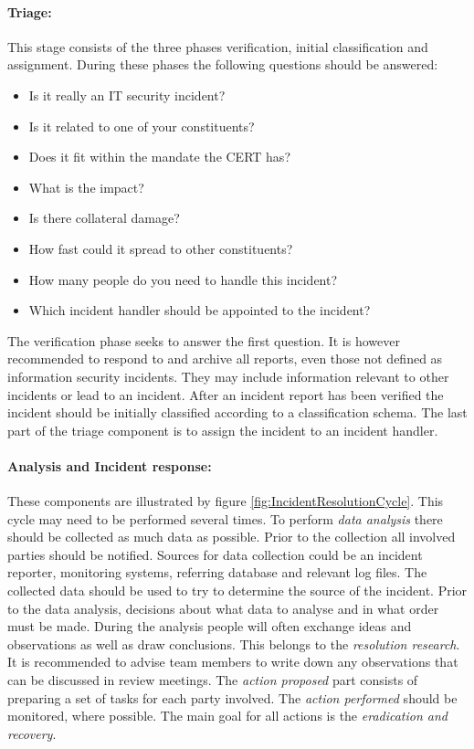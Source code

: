 \paragraph{Triage:} This stage consists of the three phases verification, initial classification and assignment. During these phases the following questions should be answered:

\begin{itemize}\itemsep-0.2cm
\item Is it really an IT security incident?
\item Is it related to one of your constituents?
\item Does it fit within the mandate the \ac{CERT} has?
\item What is the impact?
\item Is there collateral damage?
\item How fast could it spread to other constituents?
\item How many people do you need to handle this incident?
\item Which incident handler should be appointed to the incident?
\end{itemize}

The verification phase seeks to answer the first question. It is however recommended to respond to and archive all reports, even those not defined as information security incidents. They may include information relevant to other incidents or lead to an incident. After an incident report has been verified the incident should be initially classified according to a classification schema. The last part of the triage component is to assign the incident to an incident handler.

\paragraph{Analysis and Incident response:} These components are illustrated by figure \ref{fig:IncidentResolutionCycle}. This cycle may need to be performed several times. To perform \textit{data analysis} there should be collected as much data as possible. Prior to the collection all involved parties should be notified. Sources for data collection could be an incident reporter, monitoring systems, referring database and relevant log files. The collected data should be used to try to determine the source of the incident. Prior to the data analysis, decisions about what data to analyse and in what order must be made. During the analysis people will often exchange ideas and observations as well as draw conclusions. This belongs to the \textit{resolution research}. It is recommended to advise team members to write down any observations that can be discussed in review meetings. The \textit{action proposed} part consists of preparing a set of tasks for each party involved. The \textit{action performed} should be monitored, where possible. The main goal for all actions is the \textit{eradication and recovery}.

